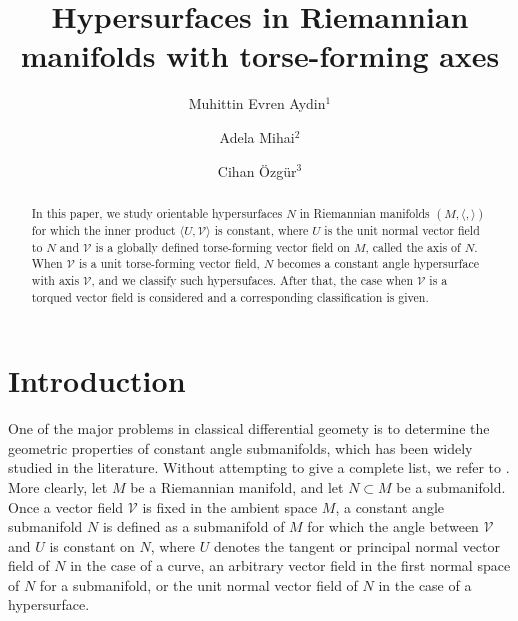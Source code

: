 \documentclass[12pt]{amsart}
\def\v{\mathcal V}
\theoremstyle{definition}
\begin{document}
\title[Hypersurfaces with torse-forming axes]{Hypersurfaces in Riemannian manifolds with torse-forming axes}


\author{Muhittin Evren Aydin$^1$}
\address{$^1$Department of Mathematics, Faculty of Science, Firat University, Elazig,  23200 Turkey
\newline
ORCID: 0000-0001-9337-8165}
\author{ Adela Mihai$^2$}
 \address{$^2$Technical University of Civil Engineering Bucharest,
Department of Mathematics and Computer Science, 020396, Bucharest, Romania
and Transilvania University of Bra\c{s}ov, Interdisciplinary Doctoral
School, 500036, Bra\c{s}ov, Romania
\newline
ORCID: 0000-0003-2033-8394}

\author{ Cihan Özgür$^3$}
 \address{$^3$Department of Mathematics, Izmir Democracy University, 35140, Karabaglar, Izmir, Turkey
 \newline
ORCID: 0000-0002-4579-7151}



\begin{abstract}
In this paper, we study orientable hypersurfaces $N$ in Riemannian manifolds $(M,\langle , \rangle)$ for which the inner product $\langle U, \v \rangle$ is constant, where $U$ is the unit normal vector field to $N$ and $\v$ is a globally defined torse-forming vector field on $M$, called the axis of $N$. When $\v$ is a unit torse-forming vector field, $N$ becomes a constant angle hypersurface with axis $\v$, and we classify such hypersufaces. After that, the case when $\v$ is a torqued vector field is considered and a corresponding classification is given.
\end{abstract}
\maketitle

\section{Introduction} \label{intro}

One of the major problems in classical differential geomety is to determine the geometric properties of constant angle submanifolds, which has been widely studied in the literature. Without attempting to give a complete list, we refer to \cite{bar,cd,crs0,dgd,dmvv,dsr,gpr,lo,loy3,mun,mun1,mun2}.  More clearly, let $M$ be a Riemannian manifold, and let $N\subset M$ be a submanifold. Once a vector field $\v$ is fixed in the ambient space $M$, a constant angle submanifold $N$ is defined as a submanifold of $M$ for which the angle between $\v$ and $U$ is constant on $N$, where $U$ denotes the tangent or principal normal vector field of $N$ in the case of a curve, an arbitrary vector field in the first normal space of $N$ for a submanifold, or the unit normal vector field of $N$ in the case of a hypersurface. 
\end{document}
